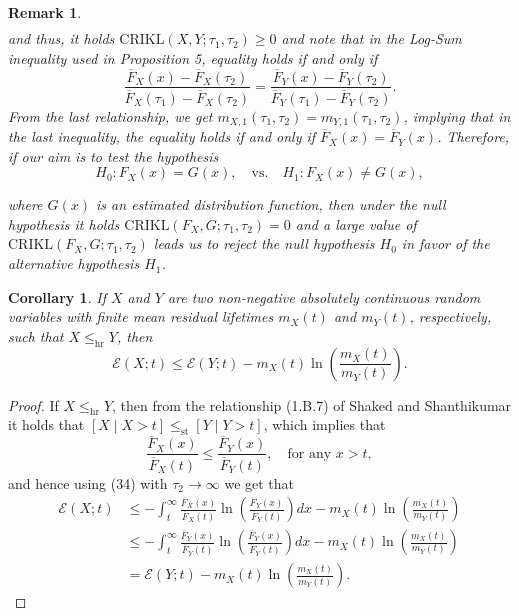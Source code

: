 \documentclass[11pt]{article}
\newtheorem{corollary}{Corollary}
\newtheorem{remark}{Remark}
\begin{document}
\begin{remark}
\begin{align*}
	\end{align*} 
	and thus, it holds $\text{CRIKL}(X,Y;\tau_1,\tau_2 ) \geq 0$ and note that in the Log-Sum inequality used in Proposition 5, equality holds if and only if
	$$ \textstyle \frac{\overline{F}_X(x)-\overline{F}_X(\tau_2)}{\overline{F}_X(\tau_1)-\overline{F}_X(\tau_2)} = \frac{\overline{F}_Y(x)-\overline{F}_Y(\tau_2)}{\overline{F}_Y(\tau_1)-\overline{F}_Y(\tau_2)}. $$
	From the last relationship, we get $m_{X,1}(\tau_1,\tau_2 ) = m_{Y,1}(\tau_1,\tau_2 )$, implying that in the last inequality, the equality holds if and only if $\overline{F}_X(x) = \overline{F}_Y(x)$. Therefore, if our aim is to test the hypothesis $$ H_0 : F_X(x)=G(x), \quad \text{vs.} \quad H_1 : F_X(x)\neq G(x), $$
	{\sloppy where $G(x)$ is an estimated distribution function, then under the null hypothesis it holds $\text{CRIKL}(F_X, G; \tau_1, \tau_2) = 0$ and a large value of $\text{CRIKL}(F_X,G;\tau_1,\tau_2 )$ leads us to reject the null hypothesis $H_0$ in favor of the alternative hypothesis $H_1$.\par}
\end{remark}
 
\begin{corollary}
	If $X$ and $Y$ are two non-negative absolutely continuous random variables with finite mean residual lifetimes $m_X(t)$ and $m_Y(t)$, respectively, such that $X \leq_{\text{hr}} Y$, then
	$$ \mathcal{E}(X;t) \leq \mathcal{E}(Y;t) - m_X(t)\ln\left(\frac{m_X(t)}{m_Y(t)}\right). $$
\end{corollary}

\begin{proof}
	If $X \leq_{\text{hr}} Y$, then from the relationship (1.B.7) of Shaked and Shanthikumar\cite{Shaked2007} it holds that $[X \mid X>t] \leq_{\text{st}} [Y \mid Y>t]$, which implies that
	$$ \textstyle \frac{\overline{F}_X(x)}{\overline{F}_X(t)} \leq \frac{\overline{F}_Y(x)}{\overline{F}_Y(t)}, \quad \text{for any } x > t, $$
	and hence using (34) with $\tau_2 \to \infty$ we get that
	\begin{align}
		\mathcal{E}(X;t) & \textstyle \leq -\int_t^\infty \frac{\overline{F}_X(x)}{\overline{F}_X(t)} \ln\left( \frac{\overline{F}_Y(x)}{\overline{F}_Y(t)} \right)dx - m_X(t)\ln\left( \frac{m_X(t)}{m_Y(t)} \right) \\
		& \textstyle \leq -\int_t^\infty \frac{\overline{F}_Y(x)}{\overline{F}_Y(t)} \ln\left( \frac{\overline{F}_Y(x)}{\overline{F}_Y(t)} \right)dx - m_X(t)\ln\left( \frac{m_X(t)}{m_Y(t)} \right) \nonumber \\
		& \textstyle = \mathcal{E}(Y;t) - m_X(t)\ln\left( \frac{m_X(t)}{m_Y(t)} \right). \nonumber
	\end{align} 
\end{proof}
\end{document}
